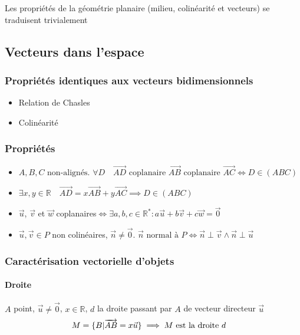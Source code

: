 \documentclass{article}
\newcommand{\R}{\mathds{R}}
\newcommand{\vect}[1]{\overrightarrow{#1}}
\begin{document}
Les propriétés de la géométrie planaire (milieu, colinéarité et vecteurs) se traduisent trivialement

\subsection{Vecteurs dans l'espace}
\subsubsection{Propriétés identiques aux vecteurs bidimensionnels}
\begin{itemize}
	\item Relation de Chasles
	\item Colinéarité
\end{itemize}
\subsubsection{Propriétés}
\begin{itemize}
	\item $A, B, C\text{ non-alignés. }\forall D \quad\vect{AD} \text{ coplanaire } \vect{AB} \text{ coplanaire }\vect{AC} \iff D \in (ABC)$
	\item $\exists x, y \in \R \quad \vect{AD} = x\vect{AB} + y\vect{AC} \implies D \in (ABC)$
	\item $\vec u$, $\vec v$ et $\vec w$ coplanaires$\iff \exists a, b, c \in \R^\ast : a\vec u + b\vec v + c\vec w = \vec 0$
	\item $\vec u, \vec v \in P$ non colinéaires, $\vec n \neq \vec 0$. $\text{$\vec n$ normal à $P$} \iff \vec n \perp \vec v \land \vec n \perp \vec u$
\end{itemize}


\subsubsection{Caractérisation vectorielle d'objets}
\paragraph{Droite}
$A$ point, $\vec u \neq \vec 0$, $x \in \R$, $d$ la droite passant par $A$ de vecteur directeur $\vec u$
\begin{align*}
	M =\{ B | \vect{AB} = x\vec u \} &\implies \text{$M$ est la droite $ d$}
\end{align*}
\end{document}
